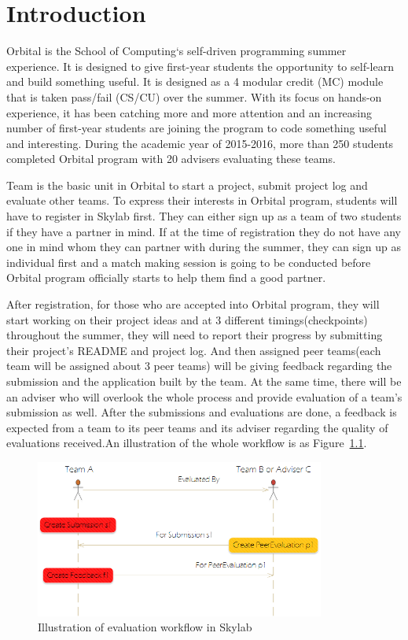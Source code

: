 \chapter{Introduction} \label{introduction}

Orbital is the School of Computing`s self-driven programming summer experience. It is designed to give first-year students the opportunity to self-learn and build something useful. It is designed as a 4 modular credit (MC) module that is taken pass/fail (CS/CU) over the summer\cite{citation0}. With its focus on hands-on experience, it has been catching more and more attention and an increasing number of first-year students are joining the program to code something useful and interesting. During the academic year of 2015-2016, more than 250 students completed Orbital program with 20 advisers evaluating these teams.

Team is the basic unit in Orbital to start a project, submit project log and evaluate other teams. To express their interests in Orbital program, students will have to register in Skylab first. They can either sign up as a team of two students if they have a partner in mind. If at the time of registration they do not have any one in mind whom they can partner with during the summer, they can sign up as individual first and a match making session is going to be conducted before Orbital program officially starts to help them find a good partner.

After registration, for those who are accepted into Orbital program, they will start working on their project ideas and at 3 different timings(checkpoints) throughout the summer, they will need to report their progress by submitting their project's README and project log. And then assigned peer teams(each team will be assigned about 3 peer teams) will be giving feedback regarding the submission and the application built by the team. At the same time, there will be an adviser who will overlook the whole process and provide evaluation of a team's submission as well. After the submissions and evaluations are done, a feedback is expected from a team to its peer teams and its adviser regarding the quality of evaluations received.An illustration of the whole workflow is as Figure~\ref{fig:EvaluationWorkflow}.

\begin{figure}[h]
  \centering
  \includegraphics[width=0.85\textwidth]{Images/Skylab_Evaluation_Workflow.png}
  \caption{Illustration of evaluation workflow in Skylab}
  \label{fig:EvaluationWorkflow}
\end{figure}

